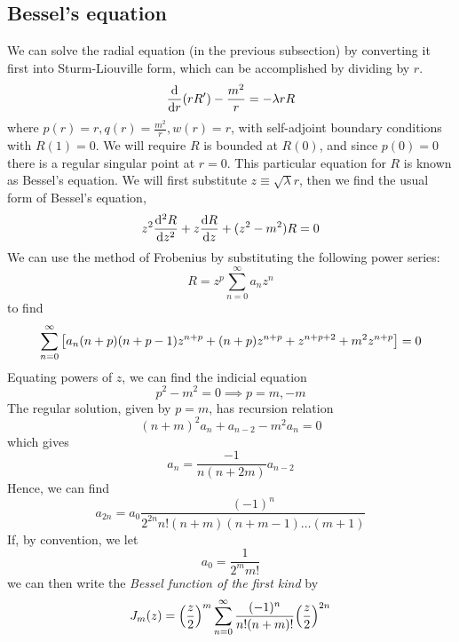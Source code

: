 \subsection{Bessel's equation}
We can solve the radial equation (in the previous subsection) by converting it first into Sturm-Liouville form, which can be accomplished by dividing by \( r \).
\[
	\dv{r} \qty(r R') - \frac{m^2}{r} = -\lambda r R
\]
where \( p(r) = r, q(r) = \frac{m^2}{r}, w(r) = r \), with self-adjoint boundary conditions with \( R(1) = 0 \).
We will require \( R \) is bounded at \( R(0) \), and since \( p(0) = 0 \) there is a regular singular point at \( r = 0 \).
This particular equation for \( R \) is known as Bessel's equation.
We will first substitute \( z \equiv \sqrt{\lambda} r \), then we find the usual form of Bessel's equation,
\[
	z^2 \dv[2]{R}{z} + z \dv{R}{z} + (z^2 - m^2)R = 0
\]
We can use the method of Frobenius by substituting the following power series:
\[
	R = z^p \sum_{n=0}^\infty a_n z^n
\]
to find
\[
	\sum_{n=0}^\infty \qty[ a_n (n+p)(n+p-1) z^{n+p} + (n+p) z^{n+p} + z^{n+p+2} + m^2 z^{n+p} ] = 0
\]
Equating powers of \( z \), we can find the indicial equation
\[
	p^2 - m^2 = 0 \implies p = m, -m
\]
The regular solution, given by \( p = m \), has recursion relation
\[
	(n+m)^2 a_n + a_{n-2} - m^2 a_n = 0
\]
which gives
\[
	a_n = \frac{-1}{n(n+2m)} a_{n-2}
\]
Hence, we can find
\[
	a_{2n} = a_0 \frac{(-1)^n}{2^{2n} n!
		(n+m)(n+m-1) \dots (m+1)}
\]
If, by convention, we let
\[
	a_0 = \frac{1}{2^m m!}
\]
we can then write the \textit{Bessel function of the first kind} by
\[
	J_m(z) = \qty(\frac{z}{2})^m \sum_{n=0}^\infty \frac{(-1)^n}{n!
		(n+m)!} \qty(\frac{z}{2})^{2n}
\]
